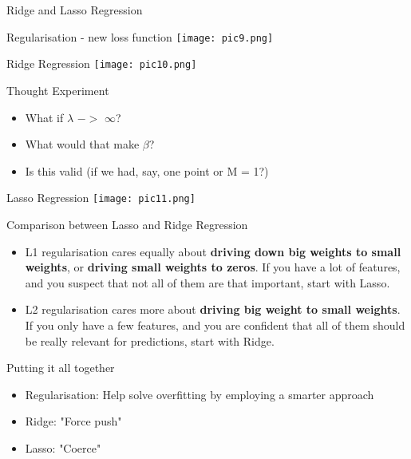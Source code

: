 \documentclass{beamer}
\begin{document}
\begin{frame}
    Ridge and Lasso Regression
\end{frame}

\begin{frame}{Regularisation - new loss function}
    \texttt{[image: pic9.png]}
\end{frame}

\begin{frame}{Ridge Regression}
        \texttt{[image: pic10.png]}
\end{frame}

\begin{frame}{Thought Experiment}
    \begin{itemize}
        \item What if $\lambda$ $->$ $\infty$?
        \item What would that make $\beta$?
        \item Is this valid (if we had, say, one point or M = 1?)
    \end{itemize}  
\end{frame}

\begin{frame}{Lasso Regression}
    \texttt{[image: pic11.png]}
\end{frame}

\begin{frame}{Comparison between Lasso and Ridge Regression}
\begin{itemize}
    \item L1 regularisation cares equally about \textbf{driving down big weights to small weights}, or \textbf{driving small weights to zeros}. If you have a lot of features, and you suspect that not all of them are that important, start with Lasso.
    \item L2 regularisation cares more about \textbf{driving big weight to small weights}. If you only have a few features, and you are confident that all of them should be really relevant for predictions, start with Ridge.
\end{itemize}
\end{frame}

\begin{frame}{Putting it all together}
    \begin{itemize}
        \item Regularisation: Help solve overfitting by employing a smarter approach
        \item Ridge: "Force push"
        \item Lasso: "Coerce"
    \end{itemize}
\end{frame}
\end{document}
